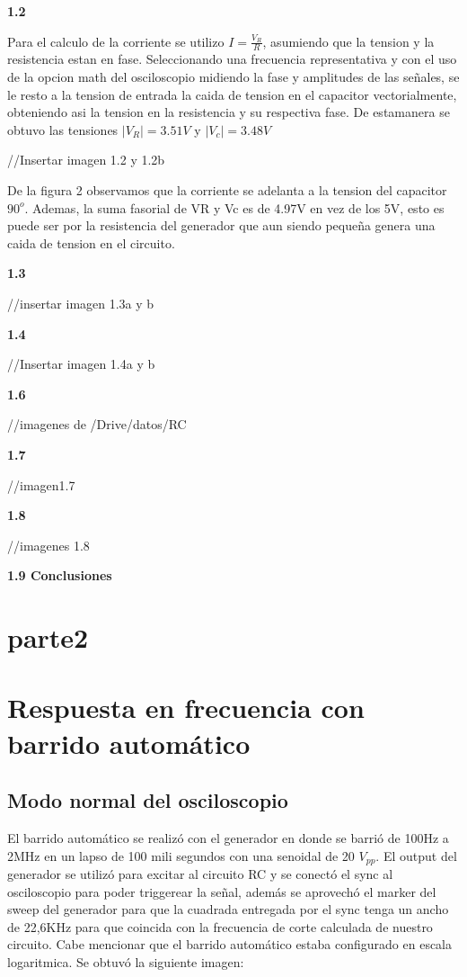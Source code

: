 \textbf{1.2 }

Para el calculo de la corriente se utilizo $I=\frac{V_{R}}{R}$, asumiendo
que la tension y la resistencia estan en fase. Seleccionando una frecuencia
representativa y con el uso de la opcion math del osciloscopio midiendo
la fase y amplitudes de las señales, se le resto a la tension de entrada
la caida de tension en el capacitor vectorialmente, obteniendo asi
la tension en la resistencia y su respectiva fase. De estamanera se
obtuvo las tensiones $|V_{R}|=3.51V$ y $|V_{c}|=3.48V$

//Insertar imagen 1.2 y 1.2b

De la figura 2 observamos que la corriente se adelanta a la tension
del capacitor $90^{o}$. Ademas, la suma fasorial de VR y Vc es de
4.97V en vez de los 5V, esto es puede ser por la resistencia del generador
que aun siendo pequeña genera una caida de tension en el circuito.

\textbf{1.3}

//insertar imagen 1.3a y b

\textbf{1.4}

//Insertar imagen 1.4a y b

\textbf{1.6}

//imagenes de /Drive/datos/RC

\textbf{1.7}

//imagen1.7

\textbf{1.8}

//imagenes 1.8

\textbf{1.9 Conclusiones}

\section{parte2}

\section{Respuesta en frecuencia con barrido automático}

\subsection{Modo normal del osciloscopio}

El barrido automático se realizó con el generador en donde se barrió
de 100Hz a 2MHz en un lapso de 100 mili segundos con una senoidal
de 20 $V_{pp}$. El output del generador se utilizó para excitar al
circuito RC y se conectó el sync al osciloscopio para poder triggerear
la señal, además se aprovechó el marker del sweep del generador para
que la cuadrada entregada por el sync tenga un ancho de 22,6KHz para
que coincida con la frecuencia de corte calculada de nuestro circuito.
Cabe mencionar que el barrido automático estaba configurado en escala
logaritmica. Se obtuvó la siguiente imagen:


